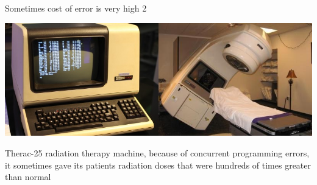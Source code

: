\documentclass[12pt]{beamer}
\begin{document}
  \begin{frame}{Sometimes cost of error is very high 2}
      \begin{center}
          \includegraphics[scale=0.5]{figures/therac.jpg}
      \end{center}
      \begin{alertblock}{Therac-25}
          radiation therapy machine, because of concurrent
          programming errors, it sometimes gave its patients radiation doses
          that were hundreds of times greater than normal~\cite{wiki:therac}
      \end{alertblock}
  \end{frame}
\end{document}
